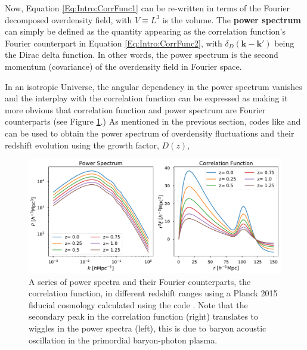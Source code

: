 \qquad Now, Equation \eqref{Eq:Intro:CorrFunc1} can be re-written in terms of the Fourier decomposed overdensity field,
with $V \equiv L^3$ is the volume. The \textbf{power spectrum} can simply be defined as the quantity appearing as the correlation function's Fourier counterpart in Equation \eqref{Eq:Intro:CorrFunc2},
with $\delta_D(\textbf{k} - \textbf{k}')$ being the Dirac delta function. In other words, the power spectrum is the second momentum (covariance) of the overdensity field in Fourier space. 

\qquad In an isotropic Universe, the angular dependency in the power spectrum vanishes and the interplay with the correlation function can be expressed as
making it more obvious that correlation function and power spectrum are Fourier counterparts (see Figure \ref{fig:Pk_Cf}.) %
As mentioned in the previous section, codes like \camb and \class can be used to obtain the power spectrum of overdensity fluctuations and their redshift evolution using the growth factor, $D(z)$,

\begin{figure}
\begin{center}
\includegraphics[width=\textwidth]{Intro-FIGS/Pk_Cf}
\caption[Power spectra and correlation functions calculated using the \class code.]{A series of power spectra and their Fourier counterparts, the correlation function, in different redshift ranges using a Planck 2015 fiducial cosmology \citep{PlanckResults2015} calculated using the \class code \citep{Class}. Note that the secondary peak in the correlation function (right) translates to wiggles in the power spectra (left), this is due to baryon acoustic oscillation in the primordial baryon-photon plasma.}
\label{fig:Pk_Cf}
\end{center}
\end{figure}

